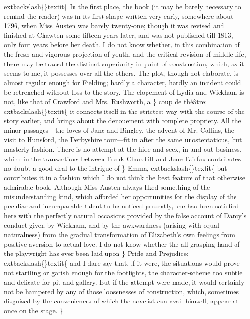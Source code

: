 \documentclass[10pt]{book}
\begin{document}
	extbackslash\{\}textit\{
    In the first place, the book (it may be barely necessary to remind the
reader) was in its first shape written very early, somewhere about 1796,
when Miss Austen was barely twenty-one; though it was revised and
finished at Chawton some fifteen years later, and was not published till
1813, only four years before her death. I do not know whether, in
    this
combination of the fresh and vigorous projection of youth, and the
critical revision of middle life, there may be traced the distinct
superiority in point of construction, which, as it seems to me, it
possesses over all the others. The plot, though not elaborate, is almost
regular enough for Fielding; hardly a character, hardly an incident
could be retrenched without loss to the story. The elopement of Lydia
and Wickham is not, like that of Crawford and Mrs. Rushworth, a
   \}
   coup de
théâtre;
   	extbackslash\{\}textit\{
    it connects itself in the strictest way with the course of the
story earlier, and brings about the denouement with complete propriety.
All the minor passages—the loves of Jane and Bingley, the advent of Mr.
Collins, the visit to Hunsford, the Derbyshire tour—fit in after the
same unostentatious, but masterly fashion. There is no attempt at the
hide-and-seek, in-and-out business, which in the transactions between
Frank Churchill and Jane Fairfax contributes no doubt a good deal to the
intrigue of
   \}
   Emma,
   	extbackslash\{\}textit\{
    but contributes it in a fashion which I do not think
the best feature of that otherwise admirable book. Although Miss Austen
always liked something of the misunderstanding kind, which afforded her
opportunities for the display of the peculiar and incomparable talent to
be noticed presently, she has been satisfied here with the perfectly
natural occasions provided by the false account of Darcy’s conduct given
by Wickham, and by the awkwardness (arising with equal naturalness) from
the gradual transformation of Elizabeth’s own feelings from positive
aversion to actual love. I do not know whether the all-grasping hand of
the playwright has ever been laid upon
   \}
   Pride and Prejudice;
   	extbackslash\{\}textit\{
    and I dare
say that,
    if it were, the situations would prove not startling or
garish enough for the footlights, the character-scheme too subtle and
delicate for pit and gallery. But if the attempt were made, it would
certainly not be hampered by any of those loosenesses of construction,
which, sometimes disguised by the conveniences of which the novelist can
avail himself, appear at once on the stage.
   \}
\end{document}
